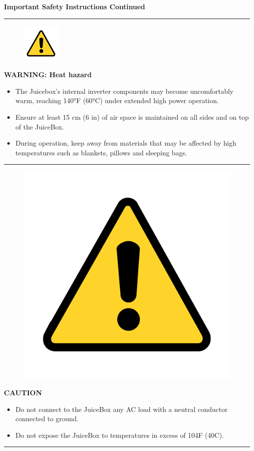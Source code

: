 \documentclass[10pt]{article}
\begin{document}
\newpage
\begin{flushleft} {\huge \textbf{Important Safety Instructions Continued} \par}
\end{flushleft}
\hrule

\begin{figure}
    \includegraphics[width=0.75in]{warning_y}
\end{figure}

\vspace{5mm}
\noindent
\Large{\textbf{WARNING: Heat hazard}} \\
\begin{large}                                        
	\begin{itemize}
		\item{ The Juicebox's internal inverter components may become uncomfortably warm,
			reaching 140°F (60°C) under extended high power operation.}
		\item{Ensure at least 15 cm (6 in) of air space is maintained on all sides and on top of the JuiceBox.}
		\item{During operation, keep away from materials that may be affected by high
			temperatures such as blankets, pillows and sleeping bags.}
	\end{itemize}
\end{large}
\hrule

\begin{figure}
    \includegraphics[width=.75in]{warning_y}
\end{figure}

\vspace{5mm}
\noindent   
\Large{\textbf{CAUTION}} \\
\begin{large}                                        
	\begin{itemize}
		\item{Do not connect to the JuiceBox any AC load with a neutral conductor connected to ground.}
		\item{Do not expose the JuiceBox to temperatures in excess of 104F (40C).}
	\end{itemize}
\end{large}
\hrule
\end{document}
